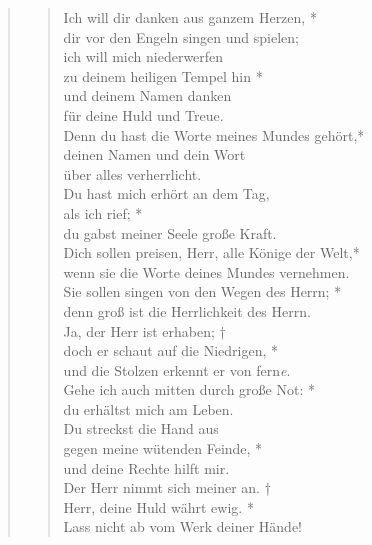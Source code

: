 \begin{quote}
\begin{verse}
Ich will dir danken aus ganzem Herzen, *\\ 
dir vor den Engeln singen und spielen; \\ 
\vin ich will mich niederwerfen\\ 
\vin zu deinem heiligen Tempel hin *\\ 
\vin und deinem Namen danken\\ 
\vin für deine Huld und Treue.\\ 
Denn du hast die Worte meines Mundes gehört,*\\  
deinen Namen und dein Wort\\
über alles verherrlicht.\\ 
\vin Du hast mich erhört an dem Tag,\\ 
\vin als ich rief; *\\ 
\vin du gabst meiner Seele große Kraft.\\ 
Dich sollen preisen, Herr, alle Könige der Welt,*\\ 
wenn sie die Worte deines Mundes vernehmen.\\ 
\vin Sie sollen singen von den Wegen des Herrn; *\\ 
\vin denn groß ist die Herrlichkeit des Herrn.\\ 
Ja, der Herr ist erhaben; †\\
doch er schaut auf die Niedrigen, *\\  
und die Stolzen erkennt er von fern\textit{e}.\\ 
\vin Gehe ich auch mitten durch große Not: *\\ 
\vin du erhältst mich am Leben.\\  
Du streckst die Hand aus\\
gegen meine wütenden Feinde, *\\  
und deine Rechte hilft mir.\\ 
\vin Der Herr nimmt sich meiner an. †\\ 
\vin Herr, deine Huld währt ewig. *\\ 
\vin Lass nicht ab vom Werk deiner Hände!\\

\end{verse}
\end{quote}




